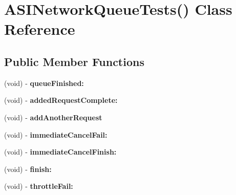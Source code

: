 \hypertarget{interface_a_s_i_network_queue_tests_07_08}{
\section{\-A\-S\-I\-Network\-Queue\-Tests() \-Class \-Reference}
\label{interface_a_s_i_network_queue_tests_07_08}
}
\subsection*{\-Public \-Member \-Functions}
\begin{DoxyCompactItemize}
\item 
\hypertarget{interface_a_s_i_network_queue_tests_07_08_a7d969cf7beaae41da4ec7ee5d2f524d4}{
(void) -\/ {\bfseries queue\-Finished\-:}}
\label{interface_a_s_i_network_queue_tests_07_08_a7d969cf7beaae41da4ec7ee5d2f524d4}

\item 
\hypertarget{interface_a_s_i_network_queue_tests_07_08_ab8add5e0479640989a141e56dfcf046a}{
(void) -\/ {\bfseries added\-Request\-Complete\-:}}
\label{interface_a_s_i_network_queue_tests_07_08_ab8add5e0479640989a141e56dfcf046a}

\item 
\hypertarget{interface_a_s_i_network_queue_tests_07_08_a7f9925729daa7cce26bd2301d1b86c2b}{
(void) -\/ {\bfseries add\-Another\-Request}}
\label{interface_a_s_i_network_queue_tests_07_08_a7f9925729daa7cce26bd2301d1b86c2b}

\item 
\hypertarget{interface_a_s_i_network_queue_tests_07_08_ab7c057d1956cb3bda4f21d43260ee1a7}{
(void) -\/ {\bfseries immediate\-Cancel\-Fail\-:}}
\label{interface_a_s_i_network_queue_tests_07_08_ab7c057d1956cb3bda4f21d43260ee1a7}

\item 
\hypertarget{interface_a_s_i_network_queue_tests_07_08_a7d6d1e74ed81581f13c7fa469a78154d}{
(void) -\/ {\bfseries immediate\-Cancel\-Finish\-:}}
\label{interface_a_s_i_network_queue_tests_07_08_a7d6d1e74ed81581f13c7fa469a78154d}

\item 
\hypertarget{interface_a_s_i_network_queue_tests_07_08_a3749253f9e2a43e19ff634c691a289b2}{
(void) -\/ {\bfseries finish\-:}}
\label{interface_a_s_i_network_queue_tests_07_08_a3749253f9e2a43e19ff634c691a289b2}

\item 
\hypertarget{interface_a_s_i_network_queue_tests_07_08_a9afb7d6be102c887541d6bb8c1a85d25}{
(void) -\/ {\bfseries throttle\-Fail\-:}}
\label{interface_a_s_i_network_queue_tests_07_08_a9afb7d6be102c887541d6bb8c1a85d25}


\end{DoxyCompactItemize}
